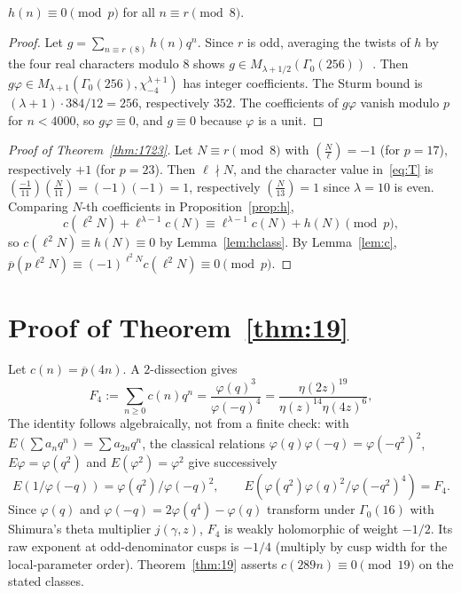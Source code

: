 \documentclass[11pt]{article}
\theoremstyle{remark}\newtheorem{remark}[theorem]{Remark}
\newcommand{\pb}{\overline{p}}
\newcommand{\leg}[2]{\left(\frac{#1}{#2}\right)}
\begin{document}
\begin{lemma}\label{lem:hclass}
$h(n)\equiv0\pmod p$ for all $n\equiv r\pmod 8$.
\end{lemma}
\begin{proof}
Let $g=\sum_{n\equiv r\ (8)}h(n)q^n$. Since $r$ is odd, averaging the twists of $h$ by the four real characters modulo $8$ shows $g\in M_{\lambda+1/2}(\Gamma_0(256))$~\cite[Prop.~2.4 and Remark~2.5]{Wei}. Then $g\varphi\in M_{\lambda+1}(\Gamma_0(256),\chi_{-4}^{\lambda+1})$ has integer coefficients. The Sturm bound is $(\lambda+1)\cdot384/12=256$, respectively $352$. The coefficients of $g\varphi$ vanish modulo $p$ for $n<4000$, so $g\varphi\equiv0$, and $g\equiv0$ because $\varphi$ is a unit.
\end{proof}

\begin{proof}[Proof of Theorem~\ref{thm:1723}]
Let $N\equiv r\pmod8$ with $\leg N\ell=-1$ (for $p=17$), respectively $+1$ (for $p=23$). Then $\ell\nmid N$, and the character value in~\eqref{eq:T} is $\leg{-1}{11}\leg N{11}=(-1)(-1)=1$, respectively $\leg N{13}=1$ since $\lambda=10$ is even. Comparing $N$-th coefficients in Proposition~\ref{prop:h},
\[c(\ell^2N)+\ell^{\lambda-1}c(N)\equiv\ell^{\lambda-1}c(N)+h(N)\pmod p,\]
so $c(\ell^2N)\equiv h(N)\equiv0$ by Lemma~\ref{lem:hclass}. By Lemma~\ref{lem:c}, $\pb(p\ell^2N)\equiv(-1)^{\ell^2N}c(\ell^2N)\equiv0\pmod p$.
\end{proof}

\section{Proof of Theorem~\ref{thm:19}}
Let $c(n)=\pb(4n)$. A $2$-dissection gives
\[F_4:=\sum_{n\ge0}c(n)q^n=\frac{\varphi(q)^3}{\varphi(-q)^4}=\frac{\eta(2z)^{19}}{\eta(z)^{14}\eta(4z)^{6}},\]
The identity follows algebraically, not from a finite check: with $E(\sum a_nq^n)=\sum a_{2n}q^n$, the classical relations $\varphi(q)\varphi(-q)=\varphi(-q^2)^2$, $E\varphi=\varphi(q^2)$ and $E(\varphi^2)=\varphi^2$ give successively
\[E(1/\varphi(-q))=\varphi(q^2)/\varphi(-q)^2,
\qquad E(\varphi(q^2)\varphi(q)^2/\varphi(-q^2)^4)=F_4.\]
Since $\varphi(q)$ and $\varphi(-q)=2\varphi(q^4)-\varphi(q)$ transform under $\Gamma_0(16)$ with Shimura's theta multiplier $j(\gamma,z)$, $F_4$ is weakly holomorphic of weight $-1/2$. Its raw exponent at odd-denominator cusps is $-1/4$ (multiply by cusp width for the local-parameter order). Theorem~\ref{thm:19} asserts $c(289n)\equiv0\pmod{19}$ on the stated classes.
\end{document}
